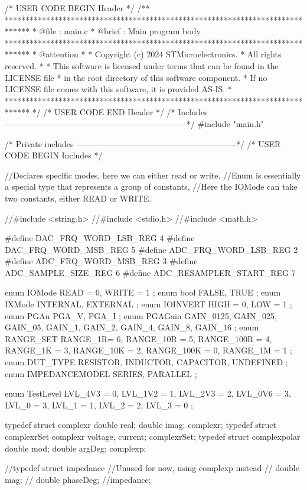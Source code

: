 /* USER CODE BEGIN Header */
/**
  ******************************************************************************
  * @file           : main.c
  * @brief          : Main program body
  ******************************************************************************
  * @attention
  *
  * Copyright (c) 2024 STMicroelectronics.
  * All rights reserved.
  *
  * This software is licensed under terms that can be found in the LICENSE file
  * in the root directory of this software component.
  * If no LICENSE file comes with this software, it is provided AS-IS.
  *
  ******************************************************************************
  */
/* USER CODE END Header */
/* Includes ------------------------------------------------------------------*/
#include "main.h"

/* Private includes ----------------------------------------------------------*/
/* USER CODE BEGIN Includes */

//Declares specific modes, here we can either read or write.
//Enum is essentially a special type that represents a group of constants,
//Here the IOMode can take two constants, either READ or WRITE.

//#include <string.h>
//#include <stdio.h>
//#include <math.h>

#define DAC_FRQ_WORD_LSB_REG 4
#define DAC_FRQ_WORD_MSB_REG 5
#define ADC_FRQ_WORD_LSB_REG 2
#define ADC_FRQ_WORD_MSB_REG 3
#define ADC_SAMPLE_SIZE_REG 6
#define ADC_RESAMPLER_START_REG 7

enum IOMode{
	READ = 0,
	WRITE = 1
};
enum bool{
	FALSE,
	TRUE
};
enum IXMode{
	INTERNAL,
	EXTERNAL
};
enum IOINVERT{
	HIGH = 0,
	LOW = 1
};
enum PGAn{
	PGA_V,
	PGA_I
};
enum PGAGain{
	GAIN_0125,
	GAIN_025,
	GAIN_05,
	GAIN_1,
	GAIN_2,
	GAIN_4,
	GAIN_8,
	GAIN_16
};
enum RANGE_SET{
	RANGE_1R= 6,
	RANGE_10R = 5,
	RANGE_100R = 4,
	RANGE_1K = 3,
	RANGE_10K = 2,
	RANGE_100K = 0,
	RANGE_1M = 1
};
enum DUT_TYPE{
	RESISTOR,
	INDUCTOR,
	CAPACITOR,
	UNDEFINED
};
enum IMPEDANCEMODEL{
	SERIES,
	PARALLEL
};

enum TestLevel{
	LVL_4V3 = 0,
	LVL_1V2 = 1,
	LVL_2V3 = 2,
	LVL_0V6 = 3,
	LVL_0 = 3,
	LVL_1 = 1,
	LVL_2 = 2,
	LVL_3 = 0
};

typedef struct complexr {
	double real;
	double imag;
}complexr;
typedef struct complexrSet{
	complexr voltage, current;
}complexrSet;
typedef struct complexpolar{
  double mod;
  double argDeg;
}complexp;

//typedef struct impedance{ //Unused for now, using complexp instead
//	double mag;
//	double phaseDeg;
//}impedance;

